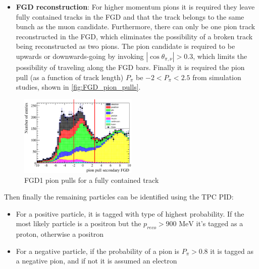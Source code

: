 \begin{itemize}
\begin{itemize}
		\item \textbf{FGD reconstruction}: For higher momentum pions it is required they leave fully contained tracks in the FGD and that the track belongs to the same bunch as the muon candidate. Furthermore, there can only be one pion track reconstructed in the FGD, which eliminates the possibility of a broken track being reconstructed as two pions. The pion candidate is required to be upwards or downwards-going by invoking $|\cos\theta_{\pi,\nu}| > 0.3$, which limits the possibility of traveling along the FGD bars. Finally it is required the pion pull (as a function of track length) $P_\pi$ be $-2 < P_\pi < 2.5$ from simulation studies, shown in \autoref{fig:FGD_pion_pulls}.
	\end{itemize}
\end{itemize}
\begin{figure}[!h]
	\includegraphics[width=0.5\textwidth]{figures/numu/Cuts/pull_secondarytrack_FGD_all.eps}
	\caption{FGD1 pion pulls for a fully contained track}
	\label{fig:FGD_pion_pulls}
\end{figure}

Then finally the remaining particles can be identified using the TPC PID: 
\begin{itemize}
	\item For a positive particle, it is tagged with type of highest probability. If the most likely particle is a positron but the $p_{reco} > 900\text{ MeV}$ it's tagged as a proton, otherwise a positron
	
	\item For a negative particle, if the probability of a pion is $P_\pi>0.8$ it is tagged as a negative pion, and if not it is assumed an electron
\end{itemize}

